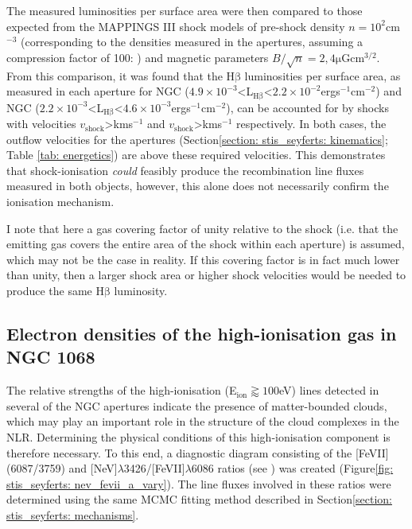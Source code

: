 The measured luminosities per surface area were then compared to those expected from the \textsc{MAPPINGS III} shock models of pre-shock density $n=10^2$\;cm$^{-3}$ (corresponding to the densities measured in the apertures, assuming a compression factor of 100: \citealt{Sutherland2017}) and magnetic parameters $B/\sqrt{n}=2,4$\;$\mathrm{\mu}$G\;cm$^{3/2}$. From this comparison, it was found that the H$\mathrm{\beta}$ luminosities per surface area, as measured in each aperture for NGC \mbox{($4.9\times10^{-3}$\;\textless\;L$_\mathrm{H\beta}$\;\textless\;$2.2\times10^{-2}$\;erg\;s$^{-1}$\;cm$^{-2}$)} and NGC \mbox{($2.2\times10^{-3}$\;\textless\;L$_\mathrm{H\beta}$\;\textless\;$4.6\times10^{-3}$\;erg\;s$^{-1}$\;cm$^{-2}$)}, can be accounted for by shocks with velocities $v_\mathrm{shock}$\;\textgreater{}\;km\;s$^{-1}$ and  $v_\mathrm{shock}$\;\textgreater{}\;km\;s$^{-1}$ respectively. In both cases, the outflow velocities for the apertures (Section\;\ref{section: stis_seyferts: kinematics}; Table \ref{tab: energetics}) are above these required velocities. This demonstrates that shock-ionisation \textit{could} feasibly produce the recombination line fluxes measured in both objects, however, this alone does not necessarily confirm the ionisation mechanism.

I note that here a gas covering factor of unity relative to the shock (i.e. that the emitting gas covers the entire area of the shock within each aperture) is assumed, which may not be the case in reality. If this covering factor is in fact much lower than unity, then a larger shock area or higher shock velocities would be needed to produce the same $\mathrm{H\beta}$ luminosity.

\subsection{Electron densities of the high-ionisation gas in NGC 1068}
\label{section: stis_seyferts: high_ionisation}

The relative strengths of the high-ionisation (E$_\mathrm{ion}\gtrapprox100$\;eV) lines detected in several of the NGC apertures indicate the presence of matter-bounded clouds, which may play an important role in the structure of the cloud complexes in the NLR. Determining the physical conditions of this high-ionisation component is therefore necessary. To this end, a diagnostic diagram consisting of the [FeVII](6087/3759) and [NeV]$\lambda$3426/[FeVII]$\lambda$6086 ratios (see \citealt{Rose2011}) was created (Figure\;\ref{fig: stis_seyferts: nev_fevii_a_vary}). The line fluxes involved in these ratios were determined using the same MCMC fitting method described in Section\;\ref{section: stis_seyferts: mechanisms}.

